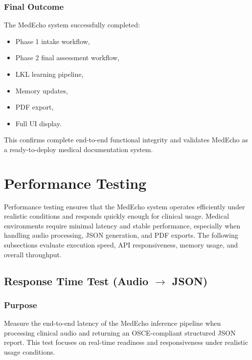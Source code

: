 \subsubsection*{Final Outcome}

The MedEcho system successfully completed:

\begin{itemize}
    \item Phase 1 intake workflow,
    \item Phase 2 final assessment workflow,
    \item LKL learning pipeline,
    \item Memory updates,
    \item PDF export,
    \item Full UI display.
\end{itemize}

This confirms complete end-to-end functional integrity and validates MedEcho as a ready-to-deploy medical documentation system.



\section{Performance Testing}
\label{sec:testing:performance}

Performance testing ensures that the MedEcho system operates efficiently under realistic 
conditions and responds quickly enough for clinical usage. Medical environments require 
minimal latency and stable performance, especially when handling audio processing, JSON 
generation, and PDF exports. The following subsections evaluate execution speed, API 
responsiveness, memory usage, and overall throughput.

\subsection{Response Time Test (Audio $\rightarrow$ JSON)}
\label{sec:testing:responsetime}

\subsubsection*{Purpose}
Measure the end-to-end latency of the MedEcho inference pipeline when processing clinical
audio and returning an OSCE-compliant structured JSON report. This test focuses on
real-time readiness and responsiveness under realistic usage conditions.

